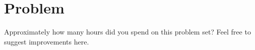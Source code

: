 \documentclass[11pt,titlepage,fleqn]{article}
\begin{document}

\section*{Problem}

Approximately how many hours did you spend on this problem set? Feel free to suggest improvements here.





%


\end{document}
